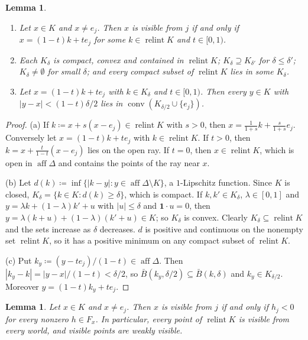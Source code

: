 \documentclass[11pt]{article}
\newcommand{\one}{\mathbf{1}}
\DeclareMathOperator{\conv}{conv}
\DeclareMathOperator{\relint}{relint}
\DeclareMathOperator{\aff}{aff}
\theoremstyle{plain}
\newtheorem{lemma}[theorem]{Lemma}
\theoremstyle{definition}
\theoremstyle{remark}
\begin{document}
\begin{lemma}\label{lem:visbasic}
\begin{enumerate}[label=(\alph*)]
  \item Let $x\in K$ and $x\neq e_j$. Then $x$ is visible from $j$ if and only if
  $x=(1-t)k+te_j$ for some $k\in\relint K$ and $t\in[0,1)$.
  \item Each $K_\delta$ is compact, convex and contained in $\relint K$; $K_\delta
  \supseteq K_{\delta'}$ for $\delta\le\delta'$; $K_\delta\neq\emptyset$ for small
  $\delta$; and every compact subset of $\relint K$ lies in some $K_\delta$.
  \item Let $x=(1-t)k+te_j$ with $k\in K_\delta$ and $t\in[0,1)$. Then every $y\in K$ with
  $|y-x|<(1-t)\delta/2$ lies in $\conv(K_{\delta/2}\cup\{e_j\})$.
\end{enumerate}
\end{lemma}

\begin{proof}
(a) If $k\coloneqq x+s(x-e_j)\in\relint K$ with $s>0$, then $x=\frac1{1+s}k+\frac
s{1+s}e_j$. Conversely let $x=(1-t)k+te_j$ with $k\in\relint K$. If $t>0$, then
$k=x+\frac t{1-t}(x-e_j)$ lies on the open ray. If $t=0$, then $x\in\relint K$, which is
open in $\aff\Delta$ and contains the points of the ray near $x$.

(b) Let $d(k)\coloneqq\inf\{|k-y|:y\in\aff\Delta\setminus K\}$, a $1$-Lipschitz function.
Since $K$ is closed, $K_\delta=\{k\in K:d(k)\ge\delta\}$, which is compact. If $k,k'\in
K_\delta$, $\lambda\in[0,1]$ and $y=\lambda k+(1-\lambda)k'+u$ with $|u|\le\delta$ and
$\one\cdot u=0$, then $y=\lambda(k+u)+(1-\lambda)(k'+u)\in K$; so $K_\delta$ is convex.
Clearly $K_\delta\subseteq\relint K$ and the sets increase as $\delta$ decreases. $d$ is
positive and continuous on the nonempty set $\relint K$, so it has a positive minimum on
any compact subset of $\relint K$.

(c) Put $k_y\coloneqq(y-te_j)/(1-t)\in\aff\Delta$. Then $|k_y-k|=|y-x|/(1-t)<\delta/2$, so
$\bar B(k_y,\delta/2)\subseteq\bar B(k,\delta)$ and $k_y\in K_{\delta/2}$. Moreover
$y=(1-t)k_y+te_j$.
\end{proof}

\begin{lemma}\label{lem:V1}
Let $x\in K$ and $x\neq e_j$. Then $x$ is visible from $j$ if and only if $h_j<0$ for
every nonzero $h\in F_x$. In particular, every point of $\relint K$ is visible from every
world, and visible points are weakly visible.
\end{lemma}
\end{document}
